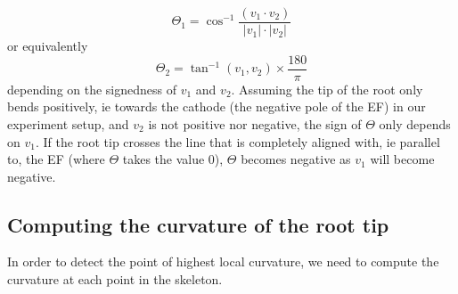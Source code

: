 \begin{equation} \label{angle1}
\Theta_{1}  = \cos^{-1}\frac{( v_{1} \cdot v_{2}) }{ | v_{1} | \cdot | v_{2} |}
\end{equation}
or equivalently
\begin{equation} \label{angle2}
\Theta_{2} = \tan^{-1}( v_{1}, v_{2}) \times \frac{180}{\pi}
\end{equation}
depending on the signedness of \( v_{1} \) and \( v_{2} \). Assuming the tip of the root only bends positively, ie towards the cathode (the negative pole of the EF) in our experiment setup, and \( v_{2} \) is not positive nor negative, the sign of \( \Theta \) only depends on \( v_{1} \). If the root tip crosses the line that is completely aligned with, ie parallel to, the EF (where \( \Theta \) takes the value 0), \( \Theta \) becomes negative as \( v_{1} \) will become negative. 


\subsection{Computing the curvature of the root tip}

In order to detect the point of highest local curvature, we need to compute the curvature at each point in the skeleton. 




%
% 
%
%






